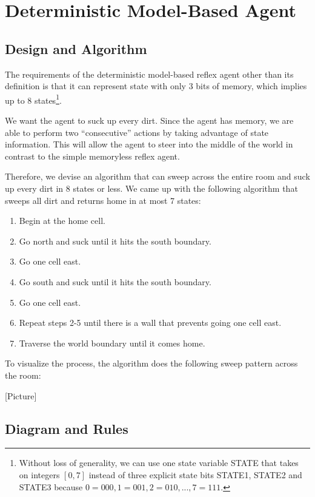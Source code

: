 \section{Deterministic Model-Based Agent}

\subsection{Design and Algorithm}

The requirements of the deterministic model-based reflex agent other than its definition is that it can represent state with only 3 bits of memory, which implies up to 8 states\footnote{Without loss of generality, we can use one state variable STATE that takes on integers $[0, 7]$ instead of three explicit state bits STATE1, STATE2 and STATE3 because $0 = 000, 1 = 001, 2 = 010, ..., 7 = 111$.}.

We want the agent to suck up every dirt. Since the agent has memory, we are able to perform two ``consecutive'' actions by taking advantage of state information. This will allow the agent to steer into the middle of the world in contrast to the simple memoryless reflex agent.

Therefore, we devise an algorithm that can sweep across the entire room and suck up every dirt in 8 states or less. We came up with the following algorithm that sweeps all dirt and returns home in at most 7 states:

\begin{enumerate}
	\item Begin at the home cell.
	\item Go north and suck until it hits the south boundary. 
	\item Go one cell east.
	\item Go south and suck until it hits the south boundary.
	\item Go one cell east.
	\item Repeat steps 2-5 until there is a wall that prevents going one cell east.
	\item Traverse the world boundary until it comes home.
\end{enumerate}

To visualize the process, the algorithm does the following sweep pattern across the room:

[Picture]

\subsection{Diagram and Rules}

